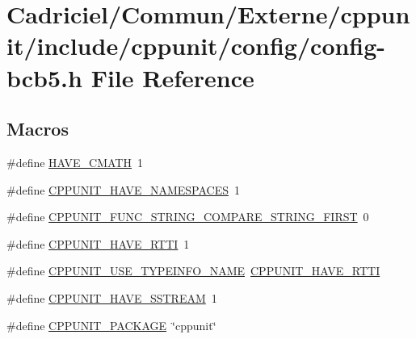 \hypertarget{config-bcb5_8h}{\section{Cadriciel/\-Commun/\-Externe/cppunit/include/cppunit/config/config-\/bcb5.h File Reference}
\label{config-bcb5_8h}
}
\subsection*{Macros}
\begin{DoxyCompactItemize}
\item 
\#define \hyperlink{config-bcb5_8h_a5ebdfdabf36598943dc9faa5699a1ba5}{H\-A\-V\-E\-\_\-\-C\-M\-A\-T\-H}~1
\item 
\#define \hyperlink{config-bcb5_8h_a3ab513bf42c44fb8ea41bd9e91249975}{C\-P\-P\-U\-N\-I\-T\-\_\-\-H\-A\-V\-E\-\_\-\-N\-A\-M\-E\-S\-P\-A\-C\-E\-S}~1
\item 
\#define \hyperlink{config-bcb5_8h_afd90d92abeeb4eaeb9b46c08cae4a7bb}{C\-P\-P\-U\-N\-I\-T\-\_\-\-F\-U\-N\-C\-\_\-\-S\-T\-R\-I\-N\-G\-\_\-\-C\-O\-M\-P\-A\-R\-E\-\_\-\-S\-T\-R\-I\-N\-G\-\_\-\-F\-I\-R\-S\-T}~0
\item 
\#define \hyperlink{config-bcb5_8h_aa57c801a8aa25a44f91b88435ebdfc99}{C\-P\-P\-U\-N\-I\-T\-\_\-\-H\-A\-V\-E\-\_\-\-R\-T\-T\-I}~1
\item 
\#define \hyperlink{config-bcb5_8h_a40c5e2a5f158770c99264e4a3e76c7c7}{C\-P\-P\-U\-N\-I\-T\-\_\-\-U\-S\-E\-\_\-\-T\-Y\-P\-E\-I\-N\-F\-O\-\_\-\-N\-A\-M\-E}~\hyperlink{config-msvc6_8h_aa57c801a8aa25a44f91b88435ebdfc99}{C\-P\-P\-U\-N\-I\-T\-\_\-\-H\-A\-V\-E\-\_\-\-R\-T\-T\-I}
\item 
\#define \hyperlink{config-bcb5_8h_abfac7981ab6ff3283d18d6f843060012}{C\-P\-P\-U\-N\-I\-T\-\_\-\-H\-A\-V\-E\-\_\-\-S\-S\-T\-R\-E\-A\-M}~1
\item 
\#define \hyperlink{config-bcb5_8h_ab061dbee09290b54646174466eff2e73}{C\-P\-P\-U\-N\-I\-T\-\_\-\-P\-A\-C\-K\-A\-G\-E}~\char`\"{}cppunit\char`\"{}
\end{DoxyCompactItemize}


